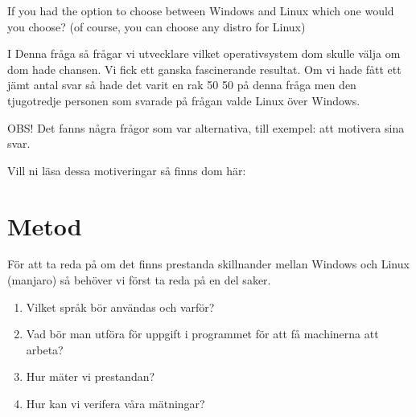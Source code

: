 \documentclass[12pt, a4paper]{report}
\begin{document}
    \vspace{1cm}


    \cite{form}
    \vspace{3cm}

    \large{If you had the option to choose between Windows and Linux which one would you choose? (of course, you can choose any distro for Linux)}
    
    \vspace{.5cm}
    
    \normalsize I Denna fråga så frågar vi utvecklare vilket operativsystem dom skulle välja om dom hade chansen. Vi fick ett ganska fascinerande resultat. Om vi hade fått ett jämt antal svar så hade det varit en rak 50 50 på denna fråga men den tjugotredje personen som svarade på frågan valde Linux över Windows.

    \vspace{1cm}


    \cite{form}

    \vspace{1cm}


    \small{OBS! Det fanns några frågor som var alternativa, till exempel: att motivera sina svar.
    
    Vill ni läsa dessa motiveringar så finns dom här:} 


\section{Metod}

För att ta reda på om det finns prestanda skillnander mellan Windows och Linux (manjaro) så behöver vi först ta reda på en del saker.

\begin{enumerate}
    \item Vilket språk bör användas och varför?
    \item Vad bör man utföra för uppgift i programmet för att få machinerna att arbeta?
    \item Hur mäter vi prestandan?
    \item Hur kan vi verifera våra mätningar?
\end{enumerate}
\end{document}

